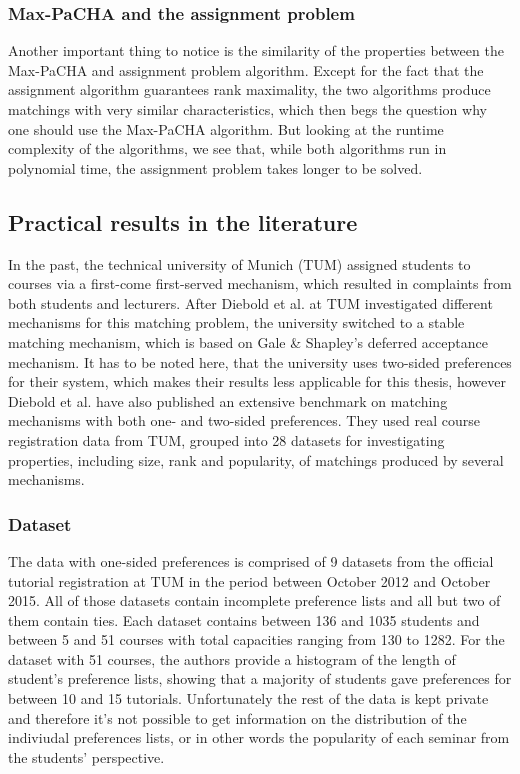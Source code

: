 \subsubsection{Max-PaCHA and the assignment problem}
Another important thing to notice is the similarity of the properties between the Max-PaCHA and assignment problem algorithm. Except for the fact that the assignment algorithm guarantees rank maximality, the two algorithms produce matchings with very similar characteristics, which then begs the question why one should use the Max-PaCHA algorithm. But looking at the runtime complexity of the algorithms, we see that, while both algorithms run in polynomial time, the assignment problem takes longer to be solved.

\subsection{Practical results in the literature}
In the past, the technical university of Munich (TUM) assigned students to courses via a first-come first-served mechanism, which resulted in complaints from both students and lecturers.\cite{tum-matching} After Diebold et al. \cite{Diebold2014} at TUM investigated different mechanisms for this matching problem, the university switched to a stable matching mechanism, which is based on Gale \& Shapley's deferred acceptance mechanism. It has to be noted here, that the university uses two-sided preferences for their system, which makes their results less applicable for this thesis, however Diebold et al. have also published an extensive benchmark on matching mechanisms with both one- and two-sided preferences.\cite{DieboldBenchmark} They used real course registration data from TUM, grouped into 28 datasets for investigating properties, including size, rank and popularity, of matchings produced by several mechanisms. 

\subsubsection{Dataset}
The data with one-sided preferences is comprised of 9 datasets from the official tutorial registration at TUM in the period between October 2012 and October 2015. All of those datasets contain incomplete preference lists and all but two of them contain ties. Each dataset contains between 136 and 1035 students and between 5 and 51 courses with total capacities ranging from 130 to 1282. For the dataset with 51 courses, the authors provide a histogram of the length of student's preference lists, showing that a majority of students gave preferences for between 10 and 15 tutorials.\cite{DieboldBenchmark} Unfortunately the rest of the data is kept private and therefore it's not possible to get information on the distribution of the indiviudal preferences lists, or in other words the popularity of each seminar from the students' perspective.


